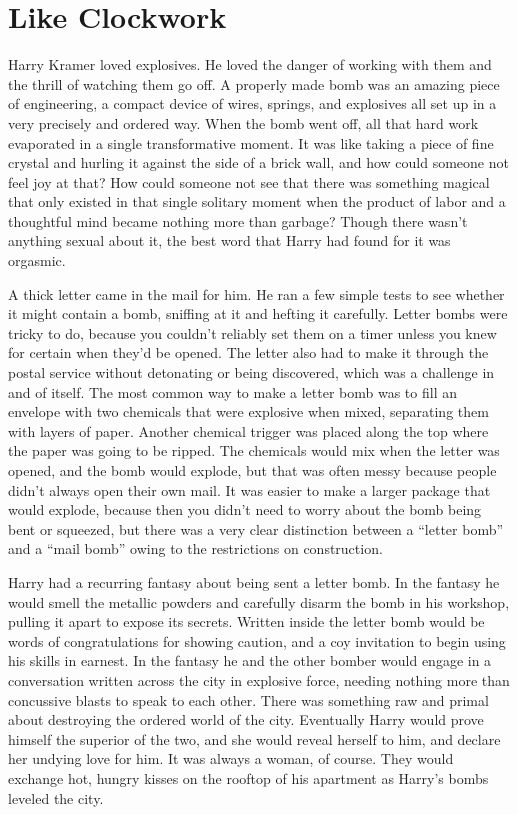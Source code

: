 \hypertarget{like-clockwork}{%
\chapter{Like Clockwork}\label{like-clockwork}}

Harry Kramer loved explosives. He loved the danger of working with them
and the thrill of watching them go off. A properly made bomb was an
amazing piece of engineering, a compact device of wires, springs, and
explosives all set up in a very precisely and ordered way. When the bomb
went off, all that hard work evaporated in a single transformative
moment. It was like taking a piece of fine crystal and hurling it
against the side of a brick wall, and how could someone not feel joy at
that? How could someone not see that there was something magical that
only existed in that single solitary moment when the product of labor
and a thoughtful mind became nothing more than garbage? Though there
wasn't anything sexual about it, the best word that Harry had found for
it was orgasmic.

A thick letter came in the mail for him. He ran a few simple tests to
see whether it might contain a bomb, sniffing at it and hefting it
carefully. Letter bombs were tricky to do, because you couldn't reliably
set them on a timer unless you knew for certain when they'd be opened.
The letter also had to make it through the postal service without
detonating or being discovered, which was a challenge in and of itself.
The most common way to make a letter bomb was to fill an envelope with
two chemicals that were explosive when mixed, separating them with
layers of paper. Another chemical trigger was placed along the top where
the paper was going to be ripped. The chemicals would mix when the
letter was opened, and the bomb would explode, but that was often messy
because people didn't always open their own mail. It was easier to make
a larger package that would explode, because then you didn't need to
worry about the bomb being bent or squeezed, but there was a very clear
distinction between a ``letter bomb'' and a ``mail bomb'' owing to the
restrictions on construction.

Harry had a recurring fantasy about being sent a letter bomb. In the
fantasy he would smell the metallic powders and carefully disarm the
bomb in his workshop, pulling it apart to expose its secrets. Written
inside the letter bomb would be words of congratulations for showing
caution, and a coy invitation to begin using his skills in earnest. In
the fantasy he and the other bomber would engage in a conversation
written across the city in explosive force, needing nothing more than
concussive blasts to speak to each other. There was something raw and
primal about destroying the ordered world of the city. Eventually Harry
would prove himself the superior of the two, and she would reveal
herself to him, and declare her undying love for him. It was always a
woman, of course. They would exchange hot, hungry kisses on the rooftop
of his apartment as Harry's bombs leveled the city.


